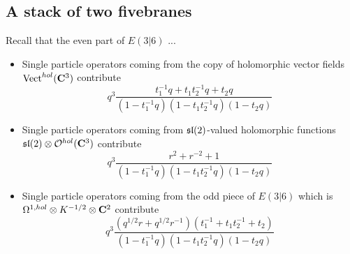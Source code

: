 \documentclass[11pt]{amsart}
\begin{document}
%
%

\subsection{A stack of two fivebranes}

\parsec[]

Recall that the even part of $E(3|6)$ ... 

\begin{itemize}
\item Single particle operators coming from the copy of holomorphic vector fields $\operatorname{Vect}^{hol}(\mathbf{C}^3)$ contribute
\[
q^3 \frac{t_1^{-1} q + t_1 t_2^{-1} q + t_2 q }{(1-t_1^{-1}q) (1-t_1 t_2^{-1} q) (1-t_2 q)} 
\]
\item Single particle operators coming from $\mathfrak{sl}(2)$-valued holomorphic functions $\mathfrak{sl}(2) \otimes \mathcal O^{hol}(\mathbf{C}^3)$ contribute
\[
q^3\frac{r^2 + r^{-2} + 1}{(1-t_1^{-1}q) (1-t_1 t_2^{-1} q) (1-t_2 q)} 
\]
\item Single particle operators coming from the odd piece of $E(3|6)$ which is $\Omega^{1,hol} \otimes K^{-1/2} \otimes \mathbf{C}^2$ contribute
\[
q^{3}\frac{(q^{1/2} r + q^{1/2} r^{-1})(t_1^{-1} + t_1t_2^{-1} + t_2)}{(1-t_1^{-1}q) (1-t_1 t_2^{-1} q) (1-t_2 q)}
\]
\end{itemize}
\end{document}
